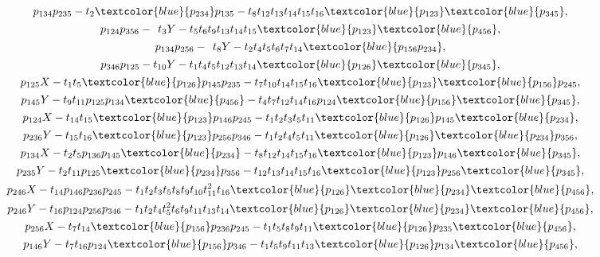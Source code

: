 \documentclass[10pt,a4paper]{amsart}
\numberwithin{equation}{section}
\begin{document}
\begin{gather*}
p_{134}p_{235}-t_{2}\textcolor{blue}{p_{234}}p_{135}-t_{8}t_{12}t_{13}t_{14}t_{15}t_{16}\textcolor{blue}{p_{123}}\textcolor{blue}{p_{345}},\\[.2ex]
%
p_{124}p_{356} -{}_{\phantom{1}} t_{3}Y - t_{5}t_{6}t_{9}t_{13}t_{14}t_{15}\textcolor{blue}{p_{123}}\textcolor{blue}{p_{456}},\\[.2ex]
p_{134}p_{256} - {}_{\phantom{1}}t_{8}Y - t_{2}t_{4}t_{5}t_{6}t_{7}t_{14}\textcolor{blue}{p_{156}p_{234}}, \\[.2ex]
p_{346}p_{125} - t_{10}Y - t_{1}t_{4}t_{5}t_{12}t_{13}t_{14}\textcolor{blue}{p_{126}}\textcolor{blue}{p_{345}},
\\[.2ex]
p_{125}X-t_{1}t_{5}\textcolor{blue}{p_{126}}p_{145}p_{235}-t_{7}t_{10}t_{14}t_{15}t_{16} \textcolor{blue}{p_{123}}\textcolor{blue}{p_{156}}p_{245},\\[.2ex]
p_{145}Y-t_{9}t_{11}p_{125}p_{134}\textcolor{blue}{p_{456}}-t_{4}t_{7}t_{12}t_{14}t_{16}p_{124}\textcolor{blue}{p_{156}}\textcolor{blue}{p_{345}},\\[.2ex]
p_{124}X-t_{14}t_{15}\textcolor{blue}{p_{123}}p_{146}p_{245}-t_{1}t_{2}t_{3}t_{5}t_{11}\textcolor{blue}{p_{126}}p_{145}\textcolor{blue}{p_{234}},\\[.2ex]
p_{236}Y-t_{15}t_{16}\textcolor{blue}{p_{123}}p_{256}p_{346}-t_{1}t_{2}t_{4}t_{5}t_{11}\textcolor{blue}{p_{126}}\textcolor{blue}{p_{234}}p_{356},\\[.2ex]
p_{134}X-t_{2}t_{5}p_{136}p_{145}\textcolor{blue}{p_{234}}-t_{8}t_{12}t_{14}t_{15}t_{16}\textcolor{blue}{p_{123}}p_{146}\textcolor{blue}{p_{345}},\\[.2ex]
p_{235}Y-t_{2}t_{11}p_{125}\textcolor{blue}{p_{234}}p_{356}-t_{12}t_{13}t_{14}t_{15}t_{16}\textcolor{blue}{p_{123}}p_{256}\textcolor{blue}{p_{345}},\\[.2ex]
p_{246}X-t_{14}p_{146}p_{236}p_{245}-t_{1}t_{2}t_{3}t_{5}t_{8}t_{9}t_{10}t_{11}^2t_{16}\textcolor{blue}{p_{126}}\textcolor{blue}{p_{234}}\textcolor{blue}{p_{456}},\\[.2ex]
p_{246}Y-t_{16}p_{124}p_{256}p_{346}-t_{1}t_{2}t_{4}t_{5}^2t_{6}t_{9}t_{11}t_{13}t_{14}\textcolor{blue}{p_{126}}\textcolor{blue}{p_{234}}\textcolor{blue}{p_{456}},\\[.2ex]
p_{256}X-t_{7}t_{14}\textcolor{blue}{p_{156}}p_{236}p_{245}-t_{1}t_{5}t_{8}t_{9}t_{11}\textcolor{blue}{p_{126}}p_{235}\textcolor{blue}{p_{456}},\\[.2ex]
p_{146}Y-t_{7}t_{16}p_{124}\textcolor{blue}{p_{156}}p_{346}-t_{1}t_{5}t_{9}t_{11}t_{13}\textcolor{blue}{p_{126}}p_{134}\textcolor{blue}{p_{456}},\\[.2ex]

\end{gather*}
\end{document}
